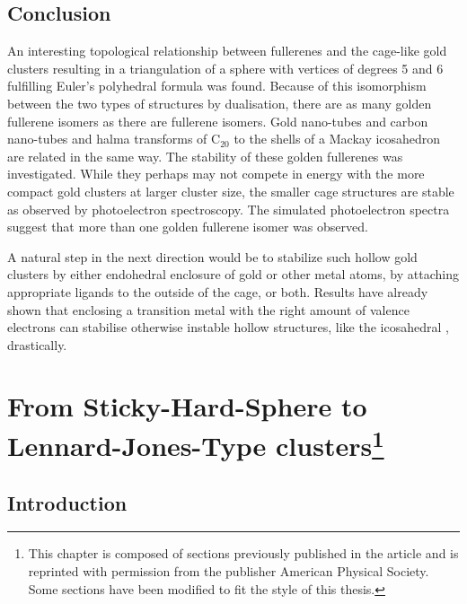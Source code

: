 \section{Conclusion}

An interesting topological relationship between fullerenes and the cage-like
gold clusters resulting in a triangulation of a sphere with vertices of degrees
5 and 6 fulfilling Euler's polyhedral formula was found. Because of this
isomorphism between the two types of structures by dualisation, there are as
many golden fullerene isomers as there are fullerene isomers. Gold nano-tubes
and carbon nano-tubes and halma transforms of C$_{20}$ to the shells of a Mackay
icosahedron are related in the same way. The stability of these golden
fullerenes was investigated. While they perhaps may not compete in energy with
the more compact gold clusters at larger cluster size, the smaller cage
structures are stable as observed by photoelectron spectroscopy. The simulated
photoelectron spectra suggest that more than one golden fullerene isomer was
observed. 

A natural step in the next direction would be to stabilize such hollow gold
clusters by either endohedral enclosure of gold or other metal atoms, by
attaching appropriate ligands to the outside of the cage, or both. Results have
already shown that enclosing a transition metal with the right amount of valence
electrons can stabilise otherwise instable hollow structures, like the
icosahedral ,
drastically.\autocite{Pyykko_IcosahedralWAu12Predicted_2002}




\chapter[From Sticky-Hard-Sphere to Lennard-Jones-Type Clusters]{From
    Sticky-Hard-Sphere to Lennard-Jones-Type clusters\footnote{This chapter is
    composed of sections previously published in the article
    \autocite{Trombach_stickyhardsphereLennardJonestypeclusters_2018}
    and is reprinted with permission from the publisher 
    American Physical Society. Some sections have been modified to fit the style
    of this thesis.}}
\label{sec:fromstickyhardspheretoLJtypeclusters}

\section{Introduction}

